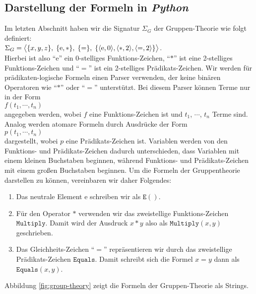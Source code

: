 \subsection{Darstellung der Formeln in \textsl{Python}}
Im letzten Abschnitt haben wir die Signatur $\Sigma_G$ der
Gruppen-Theorie wie folgt definiert:
\\[0.2cm]
\hspace*{1.3cm}
$\Sigma_G = 
   \bigl\langle \{x,y,z\},\; \{\mathrm{e},*\},\; \{=\},\; \{ \pair(\mathrm{e},0), \pair(*,2), \pair(=,2) \} \bigr\rangle 
$.
\\[0.2cm]
Hierbei ist also ``$\mathrm{e}$'' ein 0-stelliges Funktions-Zeichen, ``$*$'' ist
eine 2-stelliges Funktions-Zeichen und ``$=$'' ist ein 2-stelliges Prädikats-Zeichen.
Wir werden für prädikaten-logische Formeln einen Parser verwenden, der keine binären Operatoren wie
``$*$'' oder ``$=$'' unterstützt.  Bei diesem Parser können Terme nur in der Form
\\[0.2cm]
\hspace*{1.3cm}
$f(t_1,\cdots,t_n)$
\\[0.2cm]
angegeben werden, wobei $f$ eine Funktions-Zeichen ist und $t_1$, $\cdots$, $t_n$ Terme sind.  Analog werden
atomare Formeln durch Ausdrücke der Form
\\[0.2cm]
\hspace*{1.3cm}
$p(t_1,\cdots,t_n)$
\\[0.2cm]
dargestellt, wobei $p$ eine Prädikats-Zeichen ist.  Variablen werden von den Funktions- und Prädikats-Zeichen
dadurch unterschieden, dass Variablen mit einem kleinen Buchstaben beginnen, während Funktions- und
Prädikats-Zeichen mit einem großen Buchstaben beginnen.  Um die Formeln der Gruppentheorie darstellen zu
können, vereinbaren wir daher Folgendes:
\begin{enumerate}
\item Das neutrale Element $\mathrm{e}$ schreiben wir als $\texttt{E}()$.  
\item Für den Operator $*$ verwenden wir das zweistellige Funktions-Zeichen $\texttt{Multiply}$.
      Damit wird der Ausdruck $x*y$ also als $\texttt{Multiply}(x, y)$ geschrieben.
\item Das Gleichheits-Zeichen ``$=$'' repräsentieren wir durch das zweistellige Prädikats-Zeichen
      $\texttt{Equals}$.  Damit schreibt sich die Formel $x = y$ dann als $\texttt{Equals}(x, y)$.
\end{enumerate}
Abbildung \ref{fig:group-theory} zeigt die Formeln der Gruppen-Theorie als Strings.

